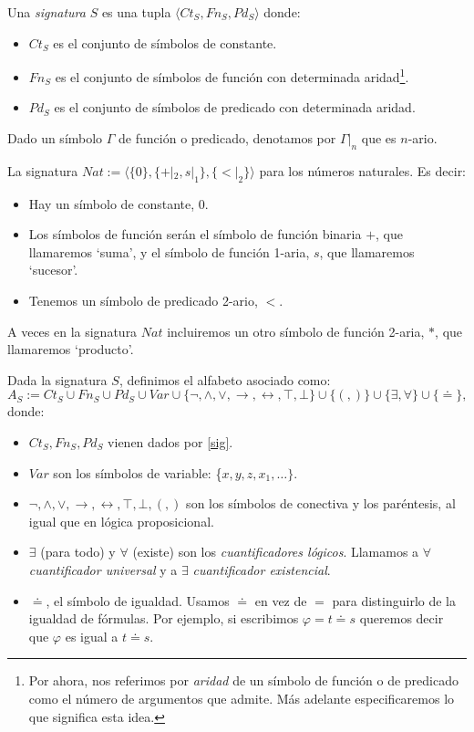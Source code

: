 \begin{definition}\label{sig}
Una \textit{signatura} $S$ es una tupla $\langle Ct_{S}, Fn_{S}, Pd_{S}\rangle$ donde:
\begin{itemize}
    \item $Ct_{S}$ es el conjunto de símbolos de constante.
    \item $Fn_{S}$ es el conjunto de símbolos de función con determinada aridad\footnote{Por ahora, nos referimos por \textit{aridad} de un símbolo de función o de predicado como el número de argumentos que admite. Más adelante especificaremos lo que significa esta idea.}.
    \item $Pd_{S}$ es el conjunto de símbolos de predicado con determinada aridad.
\end{itemize} 
Dado un símbolo $\Gamma$ de función o predicado, denotamos por $\Gamma|_{n}$ que es $n$-ario.
\end{definition}


\begin{example}\label{nat}
La signatura $Nat := \langle \{0\}, \{+|_2, s|_1\}, \{<|_2\}\rangle$ para los números naturales. Es decir:
\begin{itemize}
    \item Hay un símbolo de constante, $0$.
    \item Los símbolos de función serán el símbolo de función binaria $+$, que llamaremos `suma', y el símbolo de función 1-aria, $s$, que llamaremos `sucesor'.
    \item Tenemos un símbolo de predicado 2-ario, $<$.
\end{itemize}
A veces en la signatura $Nat$ incluiremos un otro símbolo de función 2-aria, $*$, que llamaremos `producto'.
\end{example}

\begin{definition}
Dada la signatura $S$, definimos el alfabeto asociado como:
$$A_{S} := Ct_S \cup Fn_S \cup Pd_S \cup Var \cup \{\neg, \land, \lor, \rightarrow, \leftrightarrow, \top, \bot \} \cup \{(, )\} \cup \{\exists, \forall\} \cup \{ \doteq \},$$
donde:
\begin{itemize}
    \item $Ct_S,Fn_S,Pd_S$ vienen dados por \ref{sig}.
    \item $Var$ son los símbolos de variable: \{$x,y,z,x_1,\dots\}$.
    \item $\neg, \land, \lor, \rightarrow, \leftrightarrow, \top, \bot,(,)$ son los símbolos de conectiva y los paréntesis, al igual que en lógica proposicional.
    \item $\exists$ (para todo) y $\forall$ (existe) son los \textit{cuantificadores lógicos}. Llamamos a $\forall$ \textit{cuantificador universal} y a $\exists$ \textit{cuantificador existencial}.
    \item $\doteq$, el símbolo de igualdad. Usamos $\doteq$ en vez de $=$ para distinguirlo de la igualdad de fórmulas. Por ejemplo, si escribimos $\varphi = t \doteq s$ queremos decir que $\varphi$ es igual a $t \doteq s$.
\end{itemize}

\end{definition}

